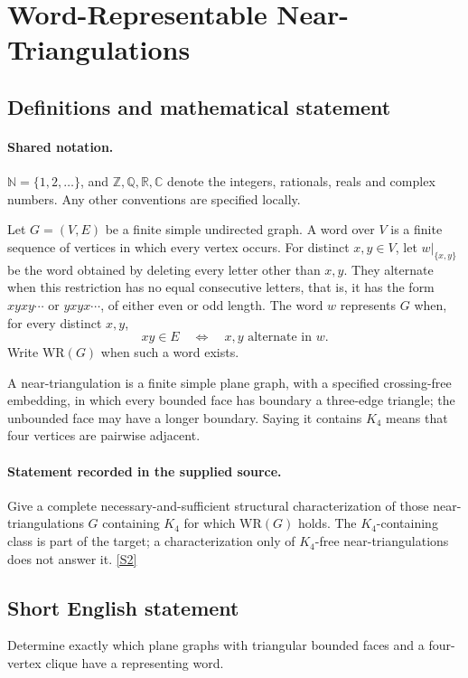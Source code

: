 \documentclass[11pt]{article}
\newcommand{\sref}[2]{\hyperlink{source:#1:#2}{[S#2]}}
\begin{document}
\section{Word-Representable Near-Triangulations}\label{statement}

\subsection{Definitions and mathematical statement}

\paragraph{Shared notation.}$\mathbb N=\{1,2,\ldots\}$, and $\mathbb Z,\mathbb Q,\mathbb R,\mathbb C$ denote the integers, rationals, reals and complex numbers. Any other conventions are specified locally.


Let $G=(V,E)$ be a finite simple undirected graph. A word over $V$ is a finite sequence of vertices in which every vertex occurs. For distinct $x,y\in V$, let $w|_{\{x,y\}}$ be the word obtained by deleting every letter other than $x,y$. They alternate when this restriction has no equal consecutive letters, that is, it has the form $xyxy\cdots$ or $yxyx\cdots$, of either even or odd length. The word $w$ represents $G$ when, for every distinct $x,y$,
\[
 xy\in E\quad\Longleftrightarrow\quad x,y\text{ alternate in }w.
\]
Write $\mathrm{WR}(G)$ when such a word exists.

A near-triangulation is a finite simple plane graph, with a specified crossing-free embedding, in which every bounded face has boundary a three-edge triangle; the unbounded face may have a longer boundary. Saying it contains $K_4$ means that four vertices are pairwise adjacent.
\paragraph{Statement recorded in the supplied source.}
Give a complete necessary-and-sufficient structural characterization of those near-triangulations $G$ containing $K_4$ for which $\mathrm{WR}(G)$ holds. The $K_4$-containing class is part of the target; a characterization only of $K_4$-free near-triangulations does not answer it. \sref{statement}{2}
\subsection{Short English statement}
Determine exactly which plane graphs with triangular bounded faces and a four-vertex clique have a representing word.
\end{document}
